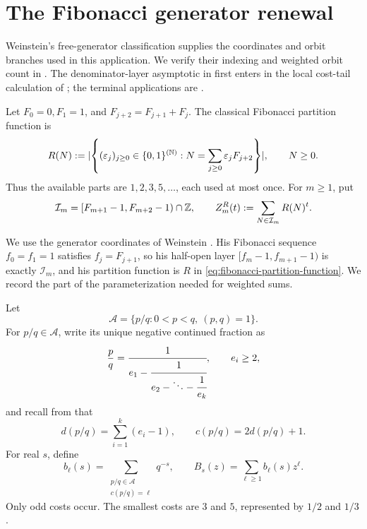 \section{The Fibonacci generator renewal}\label{sec:fibonacci-renewal}

Weinstein's free-generator classification supplies the coordinates and orbit
branches used in this application.  We verify their indexing and weighted
orbit count in .  The denominator-layer
asymptotic in  first enters in the
local cost-tail calculation of ; the
terminal applications are
.

Let \(F_0=0,F_1=1\), and \(F_{j+2}=F_{j+1}+F_j\).  The classical Fibonacci
partition function is
\begin{equation}
 R(N):=\lvert \left\{(\varepsilon_j)_{j\ge0}\in\{0,1\}^{(\mathbb N)}:
 N=\sum_{j\ge0}\varepsilon_jF_{j+2}\right\} \rvert,
 \qquad N\ge0.
 \label{eq:fibonacci-partition-function}
\end{equation}
Thus the available parts are \(1,2,3,5,\ldots\), each used at most once.
For \(m\ge1\), put
\begin{equation}
 \mathcal I_m=[F_{m+1}-1,F_{m+2}-1)\cap\mathbb{Z},
 \qquad
 Z_m^R(t):=\sum_{N\in\mathcal I_m}R(N)^t.
 \label{eq:standard-fibonacci-layer}
\end{equation}

We use the generator coordinates of Weinstein
\cite[Secs.~3--5]{Weinstein2016}.  His Fibonacci sequence
\(f_0=f_1=1\) satisfies \(f_j=F_{j+1}\), so his half-open layer
\([f_m-1,f_{m+1}-1)\) is exactly \(\mathcal I_m\), and his partition
function is \(R\) in \eqref{eq:fibonacci-partition-function}.  We record the
part of the parameterization needed for weighted sums.

Let
\[
 \mathcal A=\{p/q:0<p<q,\ (p,q)=1\}.
\]
For \(p/q\in\mathcal A\), write its unique negative continued fraction as
\[
 \frac pq=
 \cfrac1{e_1-\cfrac1{e_2-\ddots-\cfrac1{e_k}}},
 \qquad e_i\ge2,
\]
and recall from  that
\[
 d(p/q)=\sum_{i=1}^k(e_i-1),
 \qquad c(p/q)=2d(p/q)+1.
\]
For real \(s\), define
\begin{equation}
 b_\ell(s)=\sum_{\substack{p/q\in\mathcal A\\c(p/q)=\ell}}q^{-s},
 \qquad
 B_s(z)=\sum_{\ell\ge1}b_\ell(s)z^\ell.
 \label{eq:renewal-letter-series}
\end{equation}
Only odd costs occur.  The smallest costs are \(3\) and \(5\), represented
by \(1/2\) and \(1/3\).

